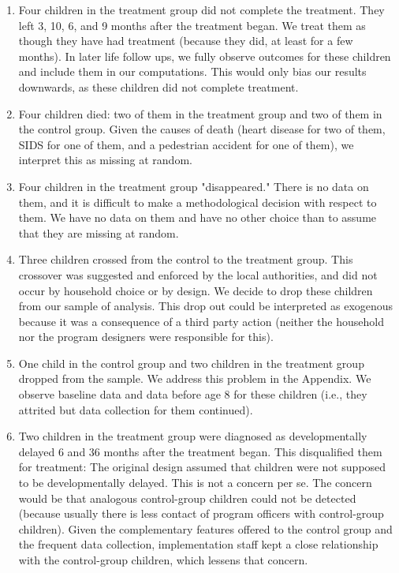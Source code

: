 \begin{enumerate}

\item Four children in the treatment group did not complete the treatment. They left 3, 10, 6, and 9 months after the treatment began. We treat them as though they have had treatment (because they did, at least for a few months). In later life follow ups, we fully observe outcomes for these children and include them in our computations. This would only bias our results downwards, as these children did not complete treatment.

\item Four children died: two of them in the treatment group and two of them in the control group. Given the causes of death (heart disease for two of them, SIDS for one of them, and a pedestrian accident for one of them), we interpret this as missing at random.

\item Four children in the treatment group "disappeared." There is no data on them, and it is difficult to make a methodological decision with respect to them. We have no data on them and have no other choice than to assume that they are missing at random.

\item Three children crossed from the control to the treatment group. This crossover was suggested and enforced by the local authorities, and did not occur by household choice or by design. We decide to drop these children from our sample of analysis. This drop out could be interpreted as exogenous because it was a consequence of a third party action (neither the household nor the program designers were responsible for this).

\item One child in the control group and two children in the treatment group dropped from the sample. We address this problem in the Appendix. We observe baseline data and data before age 8 for these children (i.e., they attrited but data collection for them continued).

\item Two children in the treatment group were diagnosed as developmentally delayed 6 and 36 months after the treatment began. This disqualified them for treatment: The original design assumed that children were not supposed to be developmentally delayed. This is not a concern per se. The concern would be that analogous control-group children could not be detected (because usually there is less contact of program officers with control-group children). Given the complementary features offered to the control group and the frequent data collection, implementation staff kept a close relationship with the control-group children, which lessens that concern.

\end{enumerate}

